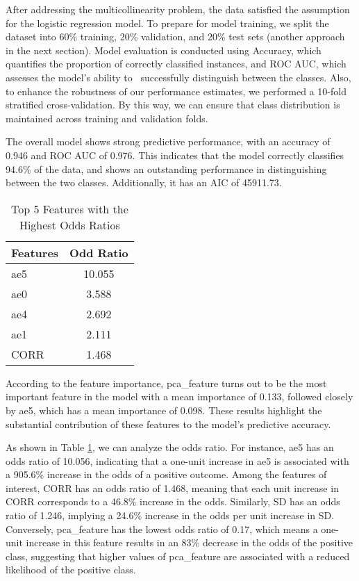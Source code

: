 \documentclass[10pt,letterpaper]{article}
\begin{document}
After addressing the multicollinearity problem, the data satisfied the assumption for the logistic regression model. To prepare for model training, we split the dataset into 60\% training, 20\% validation, and 20\% test sets (another approach in the next section). Model evaluation is conducted using Accuracy, which quantifies the proportion of correctly classified instances, and ROC AUC, which assesses the model’s ability to  successfully distinguish between the classes. Also, to enhance the robustness of our performance estimates, we performed a 10-fold stratified cross-validation. By this way, we can ensure that class distribution is maintained across training and validation folds.

The overall model shows strong predictive performance, with an accuracy of 0.946 and ROC AUC of 0.976. This indicates that the model correctly classifies 94.6\% of the data, and shows an outstanding performance in distinguishing between the two classes. Additionally, it has an AIC of 45911.73. 

\begin{table}[h]
    \centering
    \begin{tabular}{lc}  
        \toprule
        \textbf{Features} & \textbf{Odd Ratio}\\
        \midrule
        ae5 & 10.055 \\  
        ae0 & 3.588  \\ 
        ae4 & 2.692   \\
        ae1 & 2.111  \\
        CORR & 1.468 \\ 
        \bottomrule
    \end{tabular}
    \caption{Top 5 Features with the Highest Odds Ratios}
    \label{tab:Odd Ratios}
\end{table}

According to the feature importance, pca\_feature turns out to be the most important feature in the model with a mean importance of 0.133, followed closely by ae5, which has a mean importance of 0.098. These results highlight the substantial contribution of these features to the model’s predictive accuracy.

As shown in Table \ref{tab:Odd Ratios}, we can analyze the odds ratio. For instance, ae5 has an odds ratio of 10.056, indicating that a one-unit increase in ae5 is associated with a 905.6\% increase in the odds of a positive outcome. Among the features of interest, CORR has an odds ratio of 1.468, meaning that each unit increase in CORR corresponds to a 46.8\% increase in the odds. Similarly, SD has an odds ratio of 1.246, implying a 24.6\% increase in the odds per unit increase in SD. Conversely, pca\_feature has the lowest odds ratio of 0.17, which means a one-unit increase in this feature results in an 83\% decrease in the odds of the positive class, suggesting that higher values of pca\_feature are associated with a reduced likelihood of the positive class.
\end{document}
